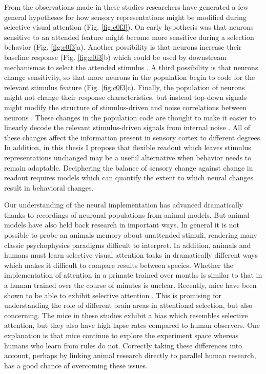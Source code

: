 From the observations made in these studies researchers have generated a few general hypotheses for how sensory representations might be modified during selective visual attention (Fig. \ref{fig:c0f3}). On early hypothesis was that neurons sensitive to an attended feature might become more sensitive during a selection behavior \citep{Reynolds2000-mg,Serences2007-le,Snyder2018-yr,Treue1999-mp} (Fig. \ref{fig:c0f3}a). Another possibility is that neurons increase their baseline response \citep{Buracas2007-pe,Chen2012-fu,Fang2008-ny,Kastner1999-qu,Li2008-fe} (Fig. \ref{fig:c0f3}b) which could be used by downstream mechanismas to select the attended stimulus \citep{Pestilli2011-gi,Hara2014-mv}. A third possibility is that neurons change sensitivity, so that more neurons in the population begin to code for the relevant stimulus feature \citep{Cukur2013-gx,David2008-zx,Kastner1998-bi,Klein2014-oe,Spitzer1988-ib,Womelsdorf2006-np,Womelsdorf2008-bm} (Fig. \ref{fig:c0f3}c). Finally, the population of neurons might not change their response characteristics, but instead top-down signals might modify the structure of stimulus-driven and noise correlations between neurons \citep{Cohen2009-bt,Mitchell2009-do, Ruff2016-dv,Verhoef2017-cm}. These changes in the population code are thought to make it easier to linearly decode the relevant stimulus-driven signals from internal noise \citep{Snyder2018-yr,Ecker2016-ro,Rabinowitz2015-uz}. All of these changes affect the information present in sensory cortex to different degrees. In addition, in this thesis I propose that flexible readout which leaves stimulus representations unchanged \citep{Birman_undated-vk} may be a useful alternative when behavior needs to remain adaptable. Deciphering the balance of sensory change against change in readout requires models which can quantify the extent to which neural changes result in behavioral changes. 

Our understanding of the neural implementation has advanced dramatically thanks to recordings of neuronal populations from animal models. But animal models have also held back research in important ways. In general it is not possible to probe an animals memory about unattended stimuli, rendering many classic psychophysics paradigms difficult to interpret. In addition, animals and humans must learn selective visual attention tasks in dramatically different ways \citep{Birman2015-fj} which makes it difficult to compare results between species. Whether the implementation of attention in a primate trained over months is similar to that in a human trained over the course of minutes is unclear. Recently, mice have been shown to be able to exhibit selective attention \citep{McBride2019-py,Wang2018-ge}. This is promising for understanding the role of different brain areas in attentional selection, but also concerning. The mice in these studies exhibit a bias which resembles selective attention, but they also have high lapse rates compared to human observers. One explanation is that mice continue to explore the experiment space \citep{Pisupati2019-cl} whereas humans who learn from rules do not. Correctly taking these differences into account, perhaps by linking animal research directly to parallel human research, has a good chance of overcoming these issues. 

